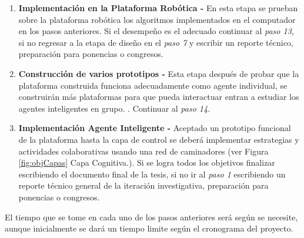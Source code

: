 \begin{enumerate}
\item \textbf{Implementación en la Plataforma Rob\'otica - } En esta etapa se prueban sobre la plataforma rob\'otica los algoritmos implementados en el computador en los pasos anteriores. Si el desempe\~no es el adecuado continuar al \emph{paso 13}, si no regresar a la etapa de dise\~no en el \emph{paso 7} y escribir un reporte t\'ecnico, preparaci\'on para ponencias o congresos.\par
\item \textbf{Construcción de varios prototipos - } Esta etapa despu\'es de probar que la plataforma construida funciona adecuadamente como agente individual, se construir\'an m\'as plataformas para que pueda interactuar entran a estudiar los agentes inteligentes en grupo. . Continuar al \emph{paso 14}.\par
\item \textbf{Implementaci\'on Agente Inteligente - } Aceptado un prototipo funcional de la plataforma hasta la capa de control se deberá  implementar estrategias y actividades colaborativas usando una red de caminadores  (ver Figura \ref{fig:objCapas} Capa Cognitiva.). Si se logra todos los objetivos finalizar escribiendo el documento final de la tesis, si no ir al \emph{paso 1} escribiendo un reporte t\'ecnico general de la iteraci\'on investigativa, preparaci\'on para ponencias o congresos.\par
\end{enumerate}
El tiempo que se tome en cada uno de los pasos anteriores ser\'a seg\'un se necesite, aunque inicialmente se dar\'a un tiempo limite seg\'un el cronograma del proyecto.\par

